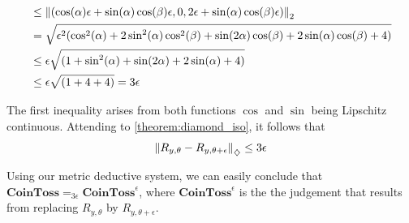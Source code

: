 \begin{example} 
\begin{align*}
  &  \leq \left\lVert ( \cos(\alpha)\epsilon + \sin(\alpha)\cos(\beta) \epsilon, 0, 2\epsilon + \sin(\alpha)\cos(\beta) \epsilon) \right\rVert_{2} \\
  & = \sqrt{\epsilon^2(\cos^2(\alpha) + 2\sin^2(\alpha)\cos^2(\beta)+\sin(2\alpha)\cos(\beta) + 2\sin(\alpha)\cos(\beta) + 4 )} \\
  &\leq \epsilon \sqrt{(1 + \sin^2(\alpha) +\sin(2\alpha) + 2\sin(\alpha) + 4 )} \\
  & \leq \epsilon \sqrt{(1 + 4 + 4 )} = 3 \epsilon
\end{align*}

The first inequality arises from both functions $\cos$ and $\sin$ being Lipschitz continuous. Attending to \autoref{theorem:diamond_iso}, it follows that
  \begin{align*}
    \left\lVert R_{y, \theta}- R_{y, \theta + \epsilon}  \right\rVert_{\diamondsuit} \leq 3 \epsilon
  \end{align*}

Using our metric deductive system, we can easily conclude that $\textbf{CoinToss} =_{3 \epsilon} \textbf{CoinToss}^{\epsilon}$, where $\textbf{CoinToss}^{\epsilon}$ is the the judgement that results from replacing $R_{y, \theta}$ by $R_{y, \theta + \epsilon}$.

\end{example}


